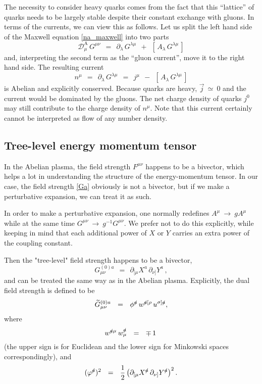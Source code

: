\documentclass[epsfig,12pt]{article}
\def\beq{\begin{equation}}
\def\eeq{\end{equation}}
\newcommand{\p}{\partial}
\newcommand{\wt}{\widetilde}
\newcommand{\md}{\mathcal{D}}
\begin{document}
        The necessity to consider heavy quarks comes from the fact that this ``lattice'' of quarks needs
        to be largely stable despite their constant exchange with gluons.
        In terms of the currents, we can view this as follows.
        Let us split the left hand side of the Maxwell equation \eqref{na_maxwell} into two parts
\beq
	\md^\text{A}_\mu\, G^{\mu\nu}    ~~=~~    \p_\lambda\, G^{\lambda\mu}  ~~+~~  [\, A_\lambda\, G^{\lambda\mu} \,]
\eeq
	and, interpreting the second term as the ``gluon current'', move it to the right hand side.
        The resulting current
\beq
\label{ex_current}
	n^\mu    ~~=~~    \p_\lambda\, G^{\lambda\mu}    ~~=~~    j^\mu  ~~-~~  [\, A_\lambda\, G^{\lambda\mu} \,]
\eeq
	is Abelian and explicitly conserved.
	Because quarks are heavy, $ \vec j ~\simeq~ 0 $ and the current would be dominated by the gluons.
	The net charge density of quarks $ j^0 $ may still contribute to the charge density of $ n^\mu $.
        Note that this current certainly cannot be interpreted as flow of any number density.




\subsection{Tree-level energy momentum tensor}
	In the Abelian plasma, the field strength $ F^{\mu\nu} $ happens to be a bivector,
	which helps a lot in understanding the structure of the energy-momentum tensor.
	In our case, the field strength \eqref{Ga} obviously is not a bivector, but
	if we make a perturbative expansion, we can treat it as such.
	
	In order to make a perturbative expansion, one normally redefines $ A^\mu ~\to~ g A^\mu $
	while at the same time $ G^{\mu\nu} ~\to~ g^{-1} G^{\mu\nu} $.
	We prefer not to do this explicitly, while keeping in mind that each additional power of $ X $ or $ Y $
	carries an extra power of the coupling constant.

	Then the "tree-level" field strength happens to be a bivector,
\beq
	G_{\mu\nu}^{(0)a}    ~~=~~    \p_{[\mu} X^a\, \p_{\nu]} Y^a\,,
\eeq
	and can be treated the same way as in the Abelian plasma.
	Explicitly, the dual field strength is defined to be
\beq
	\wt{G}{}_{\mu\nu}^{(0)a}    ~~=~~    \phi^\slashed{a}\, w^{\slashed{a}[\rho}\, u^{\sigma]\slashed{a}},
\eeq
	where
\beq
	w^{\slashed{a}\mu}\, w^{\slashed{a}}_\mu    ~~=~~    \mp\,1\,
\eeq
	(the upper sign is for Euclidean and the lower sign for Minkowski spaces correspondingly),
	and
\beq
	( \varphi^\slashed{a} )^2    ~~=~~    \frac{1}{2}\, \big( \p_{[\mu} X^\slashed{a}\, \p_{\nu]} Y^\slashed{a} \big)^2\,.
\eeq
\end{document}
